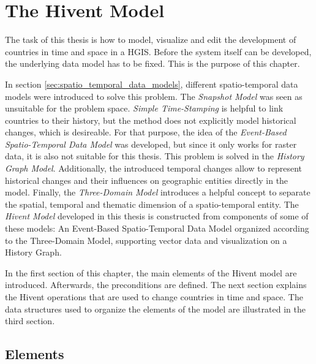 
\chapter{The Hivent Model} %
\label{cha:the_hivent_model}

The task of this thesis is how to model, visualize and edit the development of countries in time and space in a HGIS. Before the system itself can be developed, the underlying data model has to be fixed. This is the purpose of this chapter.

In section \ref{sec:spatio_temporal_data_models}, different spatio-temporal data models were introduced to solve this problem. The \emph{Snapshot Model} was seen as unsuitable for the problem space. \emph{Simple Time-Stamping} is helpful to link countries to their history, but the method does not explicitly model historical changes, which is desireable. For that purpose, the idea of the \emph{Event-Based Spatio-Temporal Data Model} was developed, but since it only works for raster data, it is also not suitable for this thesis. This problem is solved in the \emph{History Graph Model}. Additionally, the introduced temporal changes allow to represent historical changes and their influences on geographic entities directly in the model. Finally, the \emph{Three-Domain Model} introduces a helpful concept to separate the spatial, temporal and thematic dimension of a spatio-temporal entity. The \emph{Hivent Model} developed in this thesis is constructed from components of some of these models: An Event-Based Spatio-Temporal Data Model organized according to the Three-Domain Model, supporting vector data and visualization on a History Graph.

In the first section of this chapter, the main elements of the Hivent model are introduced. Afterwards, the preconditions are defined. The next section explains the Hivent operations that are used to change countries in time and space. The data structures used to organize the elements of the model are illustrated in the third section.

\section{Elements} %
\label{sec:elements}

